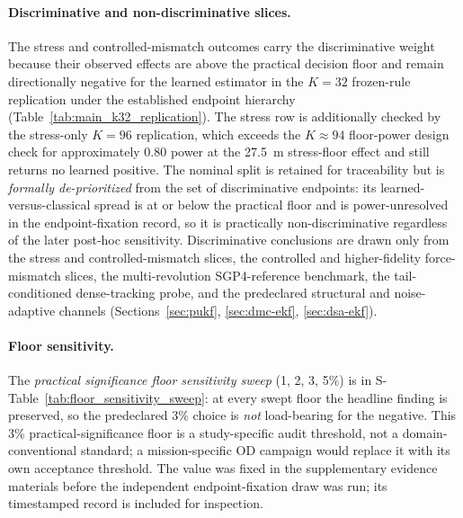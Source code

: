 \documentclass{article}
\begin{document}
\paragraph{Discriminative and non-discriminative slices.}
The stress and controlled-mismatch outcomes carry the discriminative weight because their observed effects are above the practical decision floor and remain directionally negative for the learned estimator in the $K=32$ frozen-rule replication under the established endpoint hierarchy (Table~\ref{tab:main_k32_replication}). The stress row is additionally checked by the stress-only $K=96$ replication, which exceeds the $K\approx94$ floor-power design check for approximately 0.80 power at the 27.5~m stress-floor effect and still returns no learned positive. The nominal split is retained for traceability but is \emph{formally de-prioritized} from the set of discriminative endpoints: its learned-versus-classical spread is at or below the practical floor and is power-unresolved in the endpoint-fixation record, so it is practically non-discriminative regardless of the later post-hoc sensitivity. Discriminative conclusions are drawn only from the stress and controlled-mismatch slices, the controlled and higher-fidelity force-mismatch slices, the multi-revolution SGP4-reference benchmark, the tail-conditioned dense-tracking probe, and the predeclared structural and noise-adaptive channels (Sections~\ref{sec:pukf}, \ref{sec:dmc-ekf}, \ref{sec:dsa-ekf}).

\paragraph{Floor sensitivity.}
The \emph{practical significance floor sensitivity sweep} (1, 2, 3, 5\%) is in S-Table~\ref{tab:floor_sensitivity_sweep}: at every swept floor the headline finding is preserved, so the predeclared 3\% choice is \emph{not} load-bearing for the negative. This 3\% practical-significance floor is a study-specific audit threshold, not a domain-conventional standard; a mission-specific OD campaign would replace it with its own acceptance threshold. The value was fixed in the supplementary evidence materials before the independent endpoint-fixation draw was run; its timestamped record is included for inspection.
\end{document}
